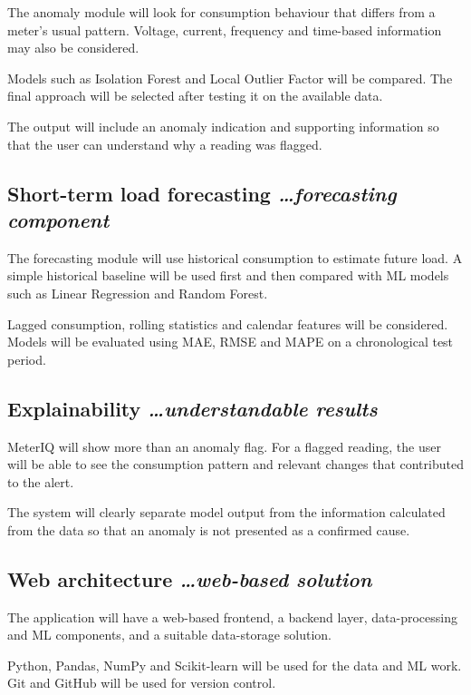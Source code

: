 \documentclass[11pt,a4paper]{article}
\newcommand{\BvrHint}[1]{%
  {\normalfont\normalsize\itshape\hfill #1}}
\begin{document}
The anomaly module will look for consumption behaviour that differs
from a meter's usual pattern. Voltage, current, frequency and
time-based information may also be considered.

Models such as Isolation Forest and Local Outlier Factor will be
compared. The final approach will be selected after testing it on
the available data.

The output will include an anomaly indication and supporting
information so that the user can understand why a reading was
flagged.

\subsection{Short-term load forecasting %
  \BvrHint{\ldots forecasting component}}

The forecasting module will use historical consumption to estimate
future load. A simple historical baseline will be used first and
then compared with ML models such as Linear Regression and Random
Forest.

Lagged consumption, rolling statistics and calendar features will be
considered. Models will be evaluated using MAE, RMSE and MAPE on a
chronological test period.

\subsection{Explainability %
  \BvrHint{\ldots understandable results}}

MeterIQ will show more than an anomaly flag. For a flagged reading,
the user will be able to see the consumption pattern and relevant
changes that contributed to the alert.

The system will clearly separate model output from the information
calculated from the data so that an anomaly is not presented as a
confirmed cause.

\subsection{Web architecture %
  \BvrHint{\ldots web-based solution}}

The application will have a web-based frontend, a backend layer,
data-processing and ML components, and a suitable data-storage
solution.

Python, Pandas, NumPy and Scikit-learn will be used for the data and
ML work. Git and GitHub will be used for version control.
\end{document}
